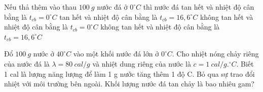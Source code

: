 \begin{ex}
	\begin{chc}
		Nếu thả thêm vào thau $100\ g$ nước đá ở $0^\circ C$ thì nước đá
		\choice
		{tan hết và nhiệt độ cân bằng là $t_{cb} = 0^\circ C$}
		{\True tan hết và nhiệt độ cân bằng là $t_{cb} = 16,6^\circ C$}
		{không tan hết và nhiệt độ cân bằng là $t_{cb} = 0^\circ C$}
		{không tan hết và nhiệt độ cân bằng là $t_{cb} = 16,6^\circ C$}
	\end{chc}
\end{ex}
\begin{ex}
	Đổ $100\ g$ nước ở $40^\circ C$ vào một khối nước đá lớn ở $0^\circ C$. Cho nhiệt nóng chảy riêng của nước đá là $\lambda=80\ cal /g$ và nhiệt dung riêng của nước là $c=1\ cal / g.^\circ C$. Biết 1 cal là lượng năng lượng để làm 1 g nước tăng thêm 1 độ C. Bỏ qua sự trao đổi nhiệt với môi trường bên ngoài. Khối lượng nước đá tan chảy là bao nhiêu gam? \\
	\end{ex}
